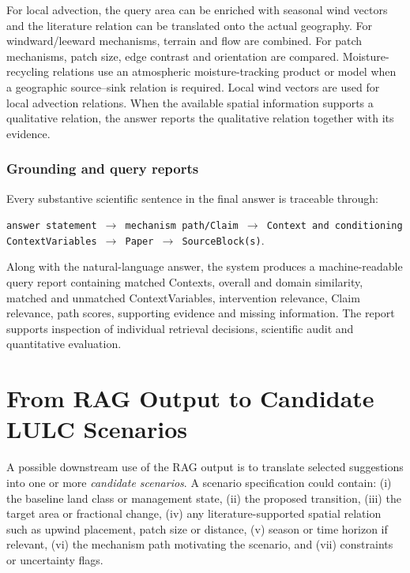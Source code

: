 \documentclass[10pt,twocolumn]{article}
\begin{document}
For local advection, the query area can be enriched with seasonal wind vectors and the literature relation can be translated onto the actual geography. For windward/leeward mechanisms, terrain and flow are combined. For patch mechanisms, patch size, edge contrast and orientation are compared. Moisture-recycling relations use an atmospheric moisture-tracking product or model when a geographic source--sink relation is required. Local wind vectors are used for local advection relations. When the available spatial information supports a qualitative relation, the answer reports the qualitative relation together with its evidence.

\subsubsection{Grounding and query reports}

Every substantive scientific sentence in the final answer is traceable through:

\begin{center}
\small
\texttt{answer statement $\rightarrow$ mechanism path/Claim $\rightarrow$ Context and conditioning ContextVariables $\rightarrow$ Paper $\rightarrow$ SourceBlock(s)}.
\end{center}

Along with the natural-language answer, the system produces a machine-readable query report containing matched Contexts, overall and domain similarity, matched and unmatched ContextVariables, intervention relevance, Claim relevance, path scores, supporting evidence and missing information. The report supports inspection of individual retrieval decisions, scientific audit and quantitative evaluation.

\section{From RAG Output to Candidate LULC Scenarios}

A possible downstream use of the RAG output is to translate selected suggestions into one or more \emph{candidate scenarios}. A scenario specification could contain: (i) the baseline land class or management state, (ii) the proposed transition, (iii) the target area or fractional change, (iv) any literature-supported spatial relation such as upwind placement, patch size or distance, (v) season or time horizon if relevant, (vi) the mechanism path motivating the scenario, and (vii) constraints or uncertainty flags.
\end{document}
